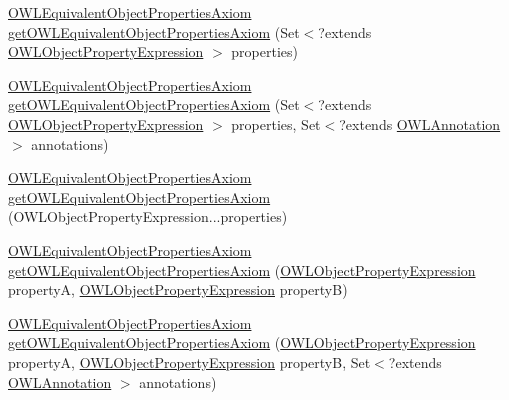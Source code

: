 \begin{DoxyCompactItemize}
\item 
\hyperlink{interfaceorg_1_1semanticweb_1_1owlapi_1_1model_1_1_o_w_l_equivalent_object_properties_axiom}{O\-W\-L\-Equivalent\-Object\-Properties\-Axiom} \hyperlink{interfaceorg_1_1semanticweb_1_1owlapi_1_1model_1_1_o_w_l_data_factory_ad7bf06b074ca97409bebbfd2f44c3347}{get\-O\-W\-L\-Equivalent\-Object\-Properties\-Axiom} (Set$<$?extends \hyperlink{interfaceorg_1_1semanticweb_1_1owlapi_1_1model_1_1_o_w_l_object_property_expression}{O\-W\-L\-Object\-Property\-Expression} $>$ properties)
\item 
\hyperlink{interfaceorg_1_1semanticweb_1_1owlapi_1_1model_1_1_o_w_l_equivalent_object_properties_axiom}{O\-W\-L\-Equivalent\-Object\-Properties\-Axiom} \hyperlink{interfaceorg_1_1semanticweb_1_1owlapi_1_1model_1_1_o_w_l_data_factory_a5f43c48e5700622048791131009badab}{get\-O\-W\-L\-Equivalent\-Object\-Properties\-Axiom} (Set$<$?extends \hyperlink{interfaceorg_1_1semanticweb_1_1owlapi_1_1model_1_1_o_w_l_object_property_expression}{O\-W\-L\-Object\-Property\-Expression} $>$ properties, Set$<$?extends \hyperlink{interfaceorg_1_1semanticweb_1_1owlapi_1_1model_1_1_o_w_l_annotation}{O\-W\-L\-Annotation} $>$ annotations)
\item 
\hyperlink{interfaceorg_1_1semanticweb_1_1owlapi_1_1model_1_1_o_w_l_equivalent_object_properties_axiom}{O\-W\-L\-Equivalent\-Object\-Properties\-Axiom} \hyperlink{interfaceorg_1_1semanticweb_1_1owlapi_1_1model_1_1_o_w_l_data_factory_a50dd44dcf3a2448ea513ac661be2d5ae}{get\-O\-W\-L\-Equivalent\-Object\-Properties\-Axiom} (O\-W\-L\-Object\-Property\-Expression...\-properties)
\item 
\hyperlink{interfaceorg_1_1semanticweb_1_1owlapi_1_1model_1_1_o_w_l_equivalent_object_properties_axiom}{O\-W\-L\-Equivalent\-Object\-Properties\-Axiom} \hyperlink{interfaceorg_1_1semanticweb_1_1owlapi_1_1model_1_1_o_w_l_data_factory_ae83e5e8683fca3eef69c8e6cfa821b37}{get\-O\-W\-L\-Equivalent\-Object\-Properties\-Axiom} (\hyperlink{interfaceorg_1_1semanticweb_1_1owlapi_1_1model_1_1_o_w_l_object_property_expression}{O\-W\-L\-Object\-Property\-Expression} property\-A, \hyperlink{interfaceorg_1_1semanticweb_1_1owlapi_1_1model_1_1_o_w_l_object_property_expression}{O\-W\-L\-Object\-Property\-Expression} property\-B)
\item 
\hyperlink{interfaceorg_1_1semanticweb_1_1owlapi_1_1model_1_1_o_w_l_equivalent_object_properties_axiom}{O\-W\-L\-Equivalent\-Object\-Properties\-Axiom} \hyperlink{interfaceorg_1_1semanticweb_1_1owlapi_1_1model_1_1_o_w_l_data_factory_aac9b15e716c74b75db755c69d93de28b}{get\-O\-W\-L\-Equivalent\-Object\-Properties\-Axiom} (\hyperlink{interfaceorg_1_1semanticweb_1_1owlapi_1_1model_1_1_o_w_l_object_property_expression}{O\-W\-L\-Object\-Property\-Expression} property\-A, \hyperlink{interfaceorg_1_1semanticweb_1_1owlapi_1_1model_1_1_o_w_l_object_property_expression}{O\-W\-L\-Object\-Property\-Expression} property\-B, Set$<$?extends \hyperlink{interfaceorg_1_1semanticweb_1_1owlapi_1_1model_1_1_o_w_l_annotation}{O\-W\-L\-Annotation} $>$ annotations)

\end{DoxyCompactItemize}
